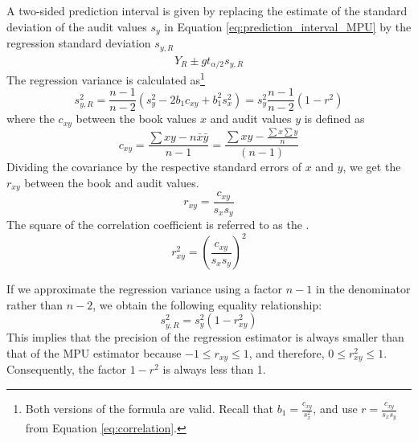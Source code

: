 \bigskip
A two-sided prediction interval is given by replacing the estimate of the standard deviation of the audit values $s_y$ in Equation \ref{eq:prediction_interval_MPU} by the regression standard deviation $s_{y, R}$
\begin{equation}
	\hat{Y}_R \pm g t_{\alpha/2} s_{y, R}
\label{eq:pred_interval_regression}
\end{equation}
The regression variance is calculated as\footnote{Both versions of the formula are valid. Recall that $b_1 = \frac{c_{xy}}{s_x^2}$, and use $r = \frac{c_{xy}}{s_x s_y}$ from Equation \ref{eq:correlation}.}
\begin{equation}
	s_{y, R}^2 = \frac{n - 1}{n - 2}(s_y^2 - 2 b_1 c_{xy} + b_1^2 s_x^2) = s_y^2 \frac{n - 1}{n - 2} (1 - r^2)
\label{eq:variance_regression}
\end{equation}
where the  $c_{xy}$ between the book values $x$ and audit values $y$ is defined as 
\begin{equation}
c_{xy} = \frac{\sum{x y} - n \bar{x} \bar{y}}{n - 1}= \frac{\sum{xy} - \frac{\sum{x}\sum{y}}{n}}{(n - 1)}
\label{eq:covariance}
\end{equation}
Dividing the covariance by the respective standard errors of $x$ and $y$, we get the  $r_{xy}$ between the book and audit values.
\begin{equation}
r_{xy} = \frac{c_{xy}}{s_{x} s_{y}}
\label{eq:correlation}
\end{equation}
The square of the correlation coefficient is referred to as the .
\begin{equation}
r^2_{xy} = \left( \frac{c_{xy}}{s_{x} s_{y}} \right)^2
\label{eq:coefficient_of_determination}
\end{equation}

If we approximate the regression variance using a factor $n - 1$ in the denominator rather than $n - 2$, we obtain the following equality relationship:
\begin{equation}
	s_{y, R}^2 = s_y^2 (1 - r_{xy}^2)
\end{equation}
This implies that the precision of the regression estimator is always smaller than that of the MPU estimator because $-1 \leq r_{xy} \leq 1$, and therefore, $0 \leq r_{xy}^2 \leq 1$. Consequently, the factor $1 - r^2$ is always less than 1.

